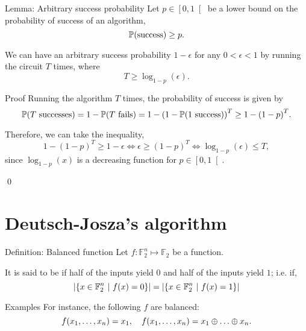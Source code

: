 \documentclass[a4paper]{article}
\begin{document}
\begin{parag}{Lemma: Arbitrary success probability}
    Let $p \in \left[0, 1\right[$ be a lower bound on the probability of success of an algorithm, 
    \[\prob\left(\text{success}\right) \geq p.\]

    We can have an arbitrary success probability $1 - \epsilon$ for any $0 < \epsilon < 1$ by running the circuit $T$ times, where
    \[T \geq \log_{1-p}\left(\epsilon\right).\]

    \begin{subparag}{Proof}
        Running the algorithm $T$ times, the probability of success is given by 
        \[\prob\left(\text{$T$ successes}\right) = 1 - \prob\left(\text{$T$ fails}\right) = 1 - \left(1 - \prob\left(\text{$1$ success}\right)\right)^T  \geq 1 - \left(1-p\right)^T.\]

        Therefore, we can take the inequality, 
        \[1 - \left(1-p\right)^T \geq 1 - \epsilon \iff \epsilon \geq \left(1-p\right)^T \iff \log_{1-p}\left(\epsilon\right) \leq T,\]
        since $\log_{1-p}\left(x\right)$ is a decreasing function for $p \in \left[0, 1\right[ $.

        \qed
    \end{subparag}
\end{parag}


\section{Deutsch-Josza's algorithm}

\begin{parag}{Definition: Balanced function}
    Let $f: \mathbb{F}_2^n \mapsto \mathbb{F}_2$ be a function.

    It is said to be  if half of the inputs yield $0$ and half of the inputs yield $1$; i.e. if, 
    \[\left|\left\{x \in \mathbb{F}_2^n \suchthat f\left(x\right) = 0\right\}\right| = \left|\left\{x \in \mathbb{F}_2^n \suchthat f\left(x\right) = 1\right\}\right|\]

    \begin{subparag}{Examples}
        For instance, the following $f$ are balanced:
        \[f\left(x_1, \ldots, x_n\right) = x_1, \mathspace f\left(x_1, \ldots, x_n\right) = x_1 \oplus \ldots \oplus x_n.\]
    \end{subparag}
\end{parag}
\end{document}

